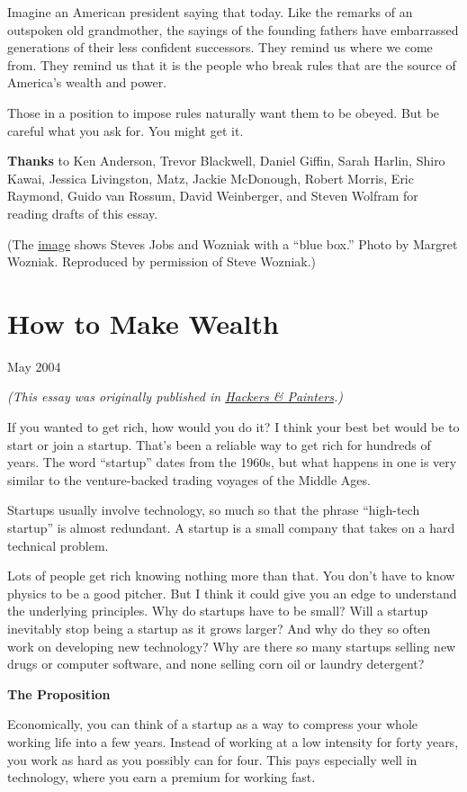 \documentclass[12pt]{book}
\begin{document}
Imagine an American president saying that today. Like the remarks of an
outspoken old grandmother, the sayings of the founding fathers have
embarrassed generations of their less confident successors. They remind
us where we come from. They remind us that it is the people who break
rules that are the source of America's wealth and power.

Those in a position to impose rules naturally want them to be obeyed.
But be careful what you ask for. You might get it.

\textbf{Thanks} to Ken Anderson, Trevor Blackwell, Daniel Giffin, Sarah
Harlin, Shiro Kawai, Jessica Livingston, Matz, Jackie McDonough, Robert
Morris, Eric Raymond, Guido van Rossum, David Weinberger, and Steven
Wolfram for reading drafts of this essay.

(The \href{bluebox.html}{image} shows Steves Jobs and Wozniak with a
``blue box.'' Photo by Margret Wozniak. Reproduced by permission of
Steve Wozniak.)
\chapter{How to Make Wealth}

May 2004

\emph{(This essay was originally published in
\href{http://www.amazon.com/gp/product/0596006624/104-0572701-7443937}{Hackers
\& Painters}.)}

If you wanted to get rich, how would you do it? I think your best bet
would be to start or join a startup. That's been a reliable way to get
rich for hundreds of years. The word ``startup'' dates from the 1960s,
but what happens in one is very similar to the venture-backed trading
voyages of the Middle Ages.

Startups usually involve technology, so much so that the phrase
``high-tech startup'' is almost redundant. A startup is a small company
that takes on a hard technical problem.

Lots of people get rich knowing nothing more than that. You don't have
to know physics to be a good pitcher. But I think it could give you an
edge to understand the underlying principles. Why do startups have to be
small? Will a startup inevitably stop being a startup as it grows
larger? And why do they so often work on developing new technology? Why
are there so many startups selling new drugs or computer software, and
none selling corn oil or laundry detergent?

\textbf{The Proposition}

Economically, you can think of a startup as a way to compress your whole
working life into a few years. Instead of working at a low intensity for
forty years, you work as hard as you possibly can for four. This pays
especially well in technology, where you earn a premium for working
fast.
\end{document}
